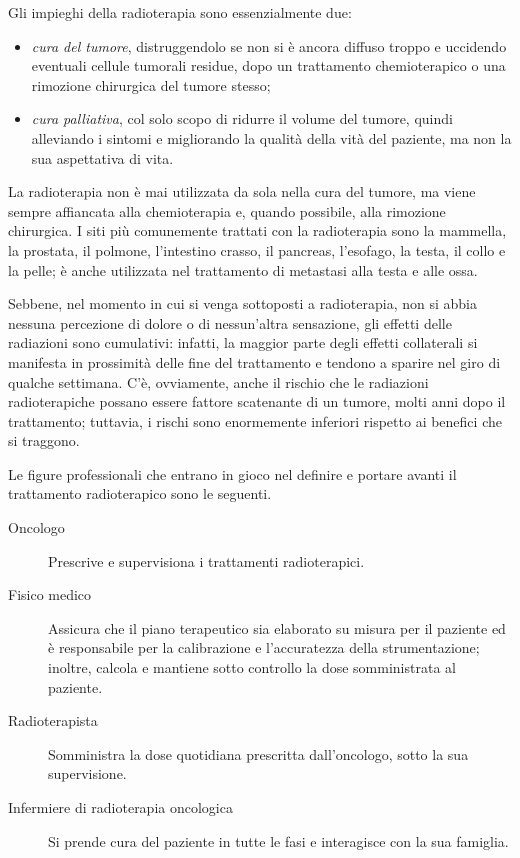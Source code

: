 \documentclass{report}
\numberwithin{equation}{section}
\numberwithin{figure}{section}
\begin{document}
\noindent Gli impieghi della radioterapia sono essenzialmente due:
\begin{itemize}[label=$-$]
    \item \emph{cura del tumore}, distruggendolo se non si è ancora diffuso troppo e uccidendo eventuali cellule tumorali residue, dopo un trattamento chemioterapico o una rimozione chirurgica del tumore stesso;
    \item \emph{cura palliativa}, col solo scopo di ridurre il volume del tumore, quindi alleviando i sintomi e migliorando la qualità della vità del paziente, ma non la sua aspettativa di vita.
\end{itemize}
La radioterapia non è mai utilizzata da sola nella cura del tumore, ma viene sempre affiancata alla chemioterapia e, quando possibile, alla rimozione chirurgica. I siti più comunemente trattati con la radioterapia sono la mammella, la prostata, il polmone, l'intestino crasso, il pancreas, l'esofago, la testa, il collo e la pelle; è anche utilizzata nel trattamento di metastasi alla testa e alle ossa.

Sebbene, nel momento in cui si venga sottoposti a radioterapia, non si abbia nessuna percezione di dolore o di nessun'altra sensazione, gli effetti delle radiazioni sono cumulativi: infatti, la maggior parte degli effetti collaterali si manifesta in prossimità delle fine del trattamento e tendono a sparire nel giro di qualche settimana. C'è, ovviamente, anche il rischio che le radiazioni radioterapiche possano essere fattore scatenante di un tumore, molti anni dopo il trattamento; tuttavia, i rischi sono enormemente inferiori rispetto ai benefici che si traggono.

Le figure professionali che entrano in gioco nel definire e portare avanti il trattamento radioterapico sono le seguenti.
\begin{description}
    \item[Oncologo] Prescrive e supervisiona i trattamenti radioterapici.
    \item[Fisico medico] Assicura che il piano terapeutico sia elaborato su misura per il paziente ed è responsabile per la calibrazione e l'accuratezza della strumentazione; inoltre, calcola e mantiene sotto controllo la dose somministrata al paziente.
    \item[Radioterapista] Somministra la dose quotidiana prescritta dall'oncologo, sotto la sua supervisione.
    \item[Infermiere di radioterapia oncologica] Si prende cura del paziente in tutte le fasi e interagisce con la sua famiglia.
\end{description}
\end{document}
